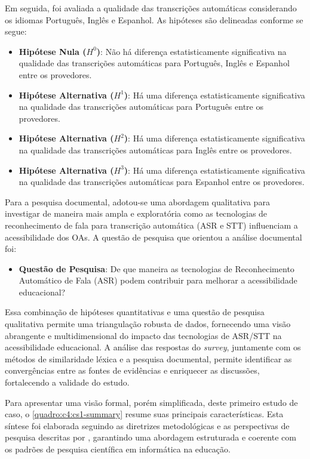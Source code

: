Em seguida, foi avaliada a qualidade das transcrições automáticas considerando os idiomas Português, Inglês e Espanhol. As hipóteses são delineadas conforme se segue:

\begin{itemize}
\item \textbf{Hipótese Nula ($H^0$)}: Não há diferença estatisticamente significativa na qualidade das transcrições automáticas para Português, Inglês e Espanhol entre os provedores.
\item \textbf{Hipótese Alternativa ($H^1$)}: Há uma diferença estatisticamente significativa na qualidade das transcrições automáticas para Português entre os provedores.
\item \textbf{Hipótese Alternativa ($H^2$)}: Há uma diferença estatisticamente significativa na qualidade das transcrições automáticas para Inglês entre os provedores.
\item \textbf{Hipótese Alternativa ($H^3$)}: Há uma diferença estatisticamente significativa na qualidade das transcrições automáticas para Espanhol entre os provedores.
\end{itemize}

Para a pesquisa documental, adotou-se uma abordagem qualitativa para investigar de maneira mais ampla e exploratória como as tecnologias de reconhecimento de fala para transcrição automática (ASR e STT) influenciam a acessibilidade dos OAs. A questão de pesquisa que orientou a análise documental foi:

\begin{itemize}
\item \textbf{Questão de Pesquisa}: De que maneira as tecnologias de Reconhecimento Automático de Fala (ASR) podem contribuir para melhorar a acessibilidade educacional?
\end{itemize}

Essa combinação de hipóteses quantitativas e uma questão de pesquisa qualitativa permite uma triangulação robusta de dados, fornecendo uma visão abrangente e multidimensional do impacto das tecnologias de ASR/STT na acessibilidade educacional. A análise das respostas do \textit{survey}, juntamente com os métodos de similaridade léxica e a pesquisa documental, permite identificar as convergências entre as fontes de evidências e enriquecer as discussões, fortalecendo a validade do estudo.

Para apresentar uma visão formal, porém simplificada, deste primeiro estudo de caso, o \autoref{quadro:c4:cs1-summary} resume suas principais características. Esta síntese foi elaborada seguindo as diretrizes metodológicas e as perspectivas de pesquisa descritas por , garantindo uma abordagem estruturada e coerente com os padrões de pesquisa científica em informática na educação.

